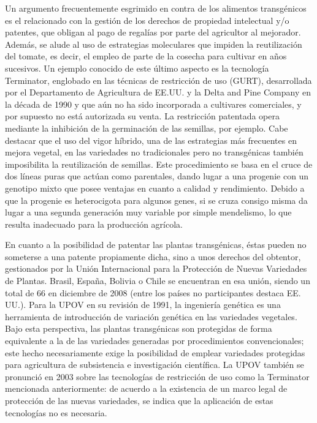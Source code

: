 \documentclass[11pt,a4paper]{article}
\begin{document}
Un argumento frecuentemente esgrimido en contra de los alimentos trans\-génicos es el relacionado con la gestión de los derechos de propiedad intelectual y/o patentes, que obligan al pago de regalías por parte del agricultor al mejorador. Además, se alude al uso de estrategias moleculares que impiden la reutilización del tomate, es decir, el empleo de parte de la cosecha para cultivar en años sucesivos. Un ejemplo conocido de este último aspecto es la tecnología Terminator, englobado en las técnicas de restricción de uso (GURT), desarrollada por el Departamento de Agricultura de EE.UU. y la Delta and Pine Company en la década de 1990 y que aún no ha sido incorporada a cultivares comerciales, y por supuesto no está autorizada su venta. La restricción patentada opera mediante la inhibición de la germinación de las semillas, por ejemplo. 
Cabe destacar que el uso del vigor híbrido, una de las estrategias más frecuentes en mejora vegetal, en las variedades no tradicionales pero no transgénicas también imposibilita la reutilización de semillas. Este procedimiento se basa en el cruce de dos líneas puras que actúan como parentales, dando lugar a una progenie con un genotipo mixto que posee ventajas en cuanto a calidad y rendimiento. Debido a que la progenie es heterocigota para algunos genes, si se cruza consigo misma da lugar a una segunda generación muy variable por simple mendelismo, lo que resulta inadecuado para la producción agrícola. 


En cuanto a la posibilidad de patentar las plantas transgénicas, éstas pueden no someterse a una patente propiamente dicha, sino a unos derechos del obtentor, gestionados por la Unión Internacional para la Protección de Nuevas Variedades de Plantas. Brasil, España, Bolivia o Chile se encuentran en esa unión, siendo un total de 66 en diciembre de 2008 (entre los países no participantes destaca EE. UU.). 
Para la UPOV en su revisión de 1991, la ingeniería genética es una herramienta de introducción de variación genética en las variedades vegetales.
Bajo esta perspectiva, las plantas transgénicas son protegidas de forma equivalente a la de las variedades generadas por procedimientos convencionales; este hecho necesariamente exige la posibilidad de emplear variedades protegidas para agricultura de subsistencia e investigación científica. La UPOV también se pronunció en 2003 sobre las tecnologías de restricción de uso como la Terminator mencionada anteriormente: de acuerdo a la existencia de un marco legal de protección de las nuevas variedades, se indica que la aplicación de estas tecnologías no es necesaria. 
\end{document}
